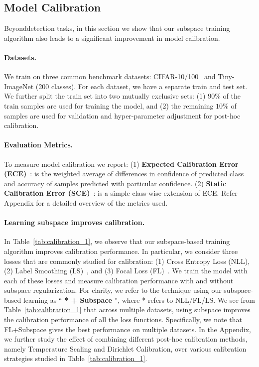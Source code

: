 \subsection{Model Calibration}
\label{subsec:calibration}



Beyond\ood detection tasks, in this section we show that our subspace training algorithm also leads to a significant improvement in model calibration. 

\paragraph{Datasets.} We train on three common benchmark datasets: CIFAR-10/100~\cite{krizhevsky2009learning} and Tiny-ImageNet\cite{deng2009imagenet} (200 classes). For each dataset, we have a separate train and test set. We further split the train set into two mutually exclusive sets: (1) $90\%$ of the train samples are used for training the model, and (2) the remaining $10\%$ of samples are used for validation and hyper-parameter adjustment for post-hoc calibration.

\paragraph{Evaluation Metrics.} To measure model calibration we report: (1) \textbf{Expected Calibration Error (ECE)}~\cite{naeini2015obtaining}: is the weighted average of differences in confidence of predicted class and accuracy of samples predicted with particular confidence. (2) \textbf{Static Calibration Error (SCE)}~\cite{nixon2019measuring}: is a simple class-wise extension of ECE. Refer Appendix for a detailed overview of the metrics used. 


\paragraph{Learning subspace improves calibration.} In Table~\ref{tab:calibration_1}, we observe that our subspace-based training algorithm improves calibration performance. In particular, we consider three losses that are commonly studied for calibration: (1) Cross Entropy Loss (NLL), (2) Label Smoothing (LS)~\cite{muller2019does}, and (3) Focal Loss (FL)~\cite{lin2017focal}. We train the model with each of these losses and measure calibration performance with and without subspace regularization. For clarity, we refer to the technique using our subspace-based learning as ``\textbf{ * + Subspace }'', where * refers to NLL/FL/LS. We see from Table~\ref{tab:calibration_1} that across multiple datasets, using subspace improves the calibration performance of all the loss functions. Specifically, we note that FL+Subspace gives the best performance on multiple datasets. In the Appendix, we further study the effect of combining different post-hoc calibration methods, namely Temperature Scaling and Dirichlet Calibration, over various calibration strategies studied in Table~\ref{tab:calibration_1}.
